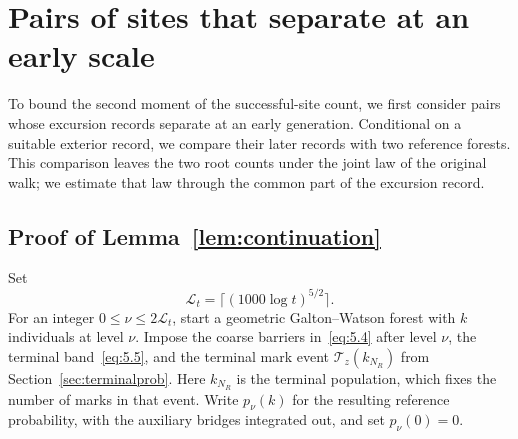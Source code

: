 \documentclass[11pt,letterpaper,reqno]{amsart}
\numberwithin{equation}{section}
\theoremstyle{remark}
\begin{document}
\section{Pairs of sites that separate at an early scale}\label{sec:tworoot}
To bound the second moment of the successful-site count, we first consider pairs whose excursion records separate at an early generation. Conditional on a suitable exterior record, we compare their later records with two reference forests. This comparison leaves the two root counts under the joint law of the original walk; we estimate that law through the common part of the excursion record.

\subsection{Proof of Lemma~\ref{lem:continuation}}\label{sec:continuation}
Set
\begin{equation}\label{eq:7.29}
\mathcal L_t=\lceil(1000\log t)^{5/2}\rceil.
\end{equation}
For an integer $0\le\nu\le2\mathcal L_t$, start a geometric Galton--Watson forest with $k$ individuals at level $\nu$. Impose the coarse barriers in~\eqref{eq:5.4} after level $\nu$, the terminal band~\eqref{eq:5.5}, and the terminal mark event $\mathcal T_z(k_{N_R})$ from Section~\ref{sec:terminalprob}. Here $k_{N_R}$ is the terminal population, which fixes the number of marks in that event. Write $p_\nu(k)$ for the resulting reference probability, with the auxiliary bridges integrated out, and set $p_\nu(0)=0$.
\end{document}
